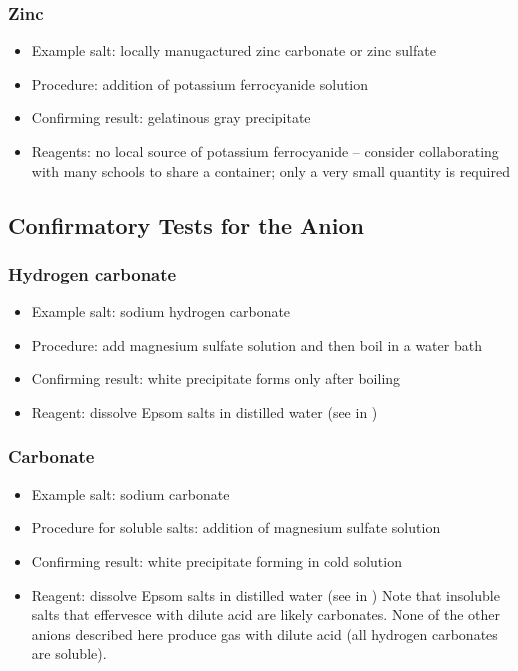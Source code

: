 \subsubsection{Zinc}
\begin{itemize}
\item{Example salt: locally manugactured zinc carbonate 
or zinc sulfate}
\item{Procedure: addition of potassium ferrocyanide solution}
\item{Confirming result: gelatinous gray precipitate}
\item{Reagents: no local source of potassium ferrocyanide -- 
consider collaborating with many schools to share a container; 
only a very small quantity is required}
\end{itemize}

\subsection{Confirmatory Tests for the Anion} 

\subsubsection{Hydrogen carbonate}
\begin{itemize}
\item{Example salt: sodium hydrogen carbonate}
\item{Procedure: add magnesium sulfate solution 
and then boil in a water bath}
\item{Confirming result: white precipitate forms only after boiling}
\item{Reagent: dissolve Epsom salts in distilled water 
(see  in )}
\end{itemize}

\subsubsection{Carbonate}
\begin{itemize}
\item{Example salt: sodium carbonate}
\item{Procedure for soluble salts: addition of magnesium sulfate solution}
\item{Confirming result: white precipitate forming in cold solution}
\item{Reagent: dissolve Epsom salts in distilled water 
(see  in )}
Note that insoluble salts that effervesce 
with dilute acid are likely carbonates. 
None of the other anions described here produce gas with dilute acid 
(all hydrogen carbonates are soluble).
\end{itemize}


